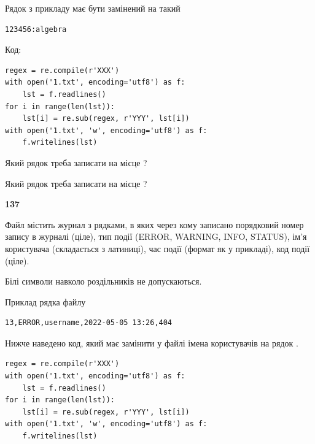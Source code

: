 Рядок з прикладу має бути замінений на такий



\begin{verbatim}
123456:algebra
\end{verbatim}




Код:



\begin{verbatim}
regex = re.compile(r'XXX')
with open('1.txt', encoding='utf8') as f:
    lst = f.readlines()
for i in range(len(lst)):
    lst[i] = re.sub(regex, r'YYY', lst[i])
with open('1.txt', 'w', encoding='utf8') as f:
    f.writelines(lst)
\end{verbatim}









Який рядок треба записати на місце  ?\par
\vspace{5mm}


Який рядок треба записати на місце  ?\par


\newpage

{\begin {center}\textbf{ 137}\end {center}}\par
Файл  містить журнал з рядками, в яких через кому записано поряд\-ко\-вий номер запису в журналі (ціле), тип події (ERROR, WARNING, INFO, STATUS), ім'я користувача (складається з латиниці), час події (фор\-мат як у прикладі), код події (ціле).

Білі символи навколо роздільників не допускаються.

Приклад рядка файлу



\begin{verbatim}
13,ERROR,username,2022-05-05 13:26,404
\end{verbatim}


Нижче наведено код, який має замінити у файлі імена користувачів на рядок .



\begin{verbatim}
regex = re.compile(r'XXX')
with open('1.txt', encoding='utf8') as f:
    lst = f.readlines()
for i in range(len(lst)):
    lst[i] = re.sub(regex, r'YYY', lst[i])
with open('1.txt', 'w', encoding='utf8') as f:
    f.writelines(lst)
\end{verbatim}







